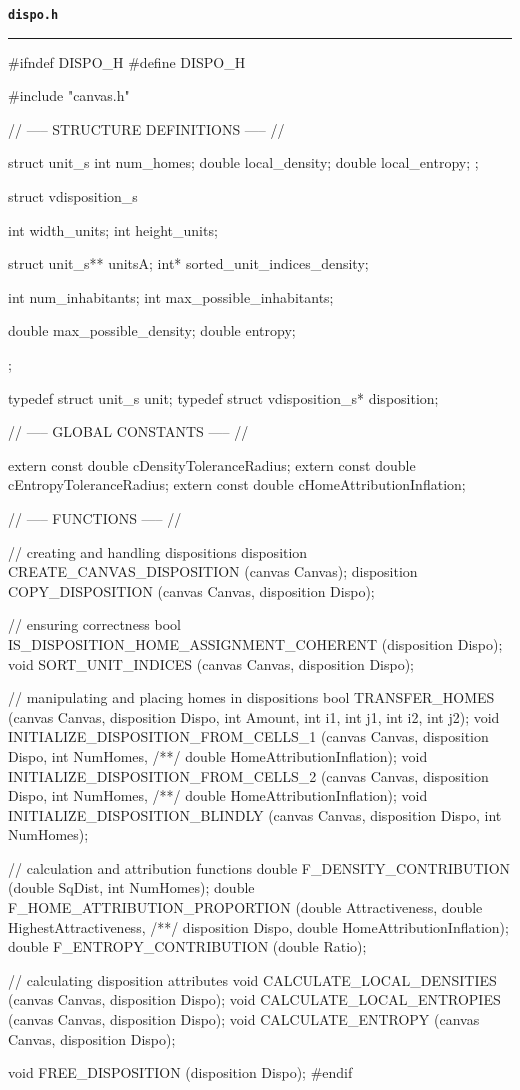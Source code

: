 \vspace*{5mm}
{\Large \texttt{\textbf{dispo.h}}}
\vspace*{1mm}
\hrule
\begin{C}
#ifndef DISPO_H
#define DISPO_H

#include "canvas.h"



// ----- STRUCTURE DEFINITIONS ----- //

struct unit_s {
	int num_homes;
	double local_density;
	double local_entropy;
};

struct vdisposition_s {
	int width_units;
	int height_units;
	
	struct unit_s** unitsA;
	int* sorted_unit_indices_density;
	
	int num_inhabitants;
	int max_possible_inhabitants;
	
	double max_possible_density;
	double entropy;
};

typedef struct unit_s unit;
typedef struct vdisposition_s* disposition;


// ----- GLOBAL CONSTANTS ----- //

extern const double cDensityToleranceRadius;
extern const double cEntropyToleranceRadius;
extern const double cHomeAttributionInflation;


// ----- FUNCTIONS ----- //

// creating and handling dispositions
disposition CREATE_CANVAS_DISPOSITION (canvas Canvas);
disposition COPY_DISPOSITION (canvas Canvas, disposition Dispo);

// ensuring correctness
bool IS_DISPOSITION_HOME_ASSIGNMENT_COHERENT (disposition Dispo);
void SORT_UNIT_INDICES (canvas Canvas, disposition Dispo);

// manipulating and placing homes in dispositions
bool TRANSFER_HOMES (canvas Canvas, disposition Dispo, int Amount, int i1, int j1, int i2, int j2);
void INITIALIZE_DISPOSITION_FROM_CELLS_1 (canvas Canvas, disposition Dispo, int NumHomes,
/**/ double HomeAttributionInflation);
void INITIALIZE_DISPOSITION_FROM_CELLS_2 (canvas Canvas, disposition Dispo, int NumHomes,
/**/ double HomeAttributionInflation);
void INITIALIZE_DISPOSITION_BLINDLY (canvas Canvas, disposition Dispo, int NumHomes);

// calculation and attribution functions
double F_DENSITY_CONTRIBUTION (double SqDist, int NumHomes);
double F_HOME_ATTRIBUTION_PROPORTION (double Attractiveness, double HighestAttractiveness,
/**/ disposition Dispo, double HomeAttributionInflation);
double F_ENTROPY_CONTRIBUTION (double Ratio);

// calculating disposition attributes
void CALCULATE_LOCAL_DENSITIES (canvas Canvas, disposition Dispo);
void CALCULATE_LOCAL_ENTROPIES (canvas Canvas, disposition Dispo);
void CALCULATE_ENTROPY (canvas Canvas, disposition Dispo);


void FREE_DISPOSITION (disposition Dispo);
#endif
\end{C}
